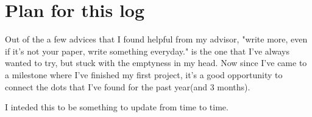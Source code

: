 \section{Plan for this log}
Out of the a few advices that I found helpful from my advisor, "write more, even if it's not your paper, write something everyday." 
is the one that I've always wanted to try, but stuck with the emptyness in my head. 
Now since I've came to a milestone where I've finished my first project, it's a good opportunity to connect the dots that I've found for the past year(and 3 months).

I inteded this to be something to update from time to time.